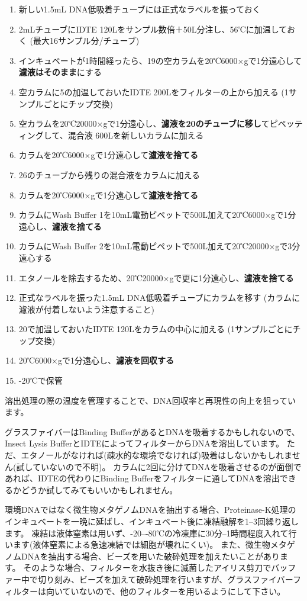 \documentclass[titlepage,10pt,a4paper,uplatex]{jsbook}
\renewcommand{\textbf}[1]{{\bfseries\sffamily#1}}
\begin{document}
\begin{enumerate}
\item 新しい1.5mL DNA低吸着チューブには正式なラベルを振っておく
\item 2mLチューブにIDTE 120{\textmu}Lをサンプル数倍＋50{\textmu}L分注し、56℃に加温しておく (最大16サンプル分/チューブ)
\item インキュベートが1時間経ったら、19の空カラムを20℃6000×gで1分遠心して\textbf{濾液はそのまま}にする
\item 空カラムに5の加温しておいたIDTE 200{\textmu}Lをフィルターの上から加える (1サンプルごとにチップ交換)
\item 空カラムを20℃20000×gで1分遠心し、\textbf{濾液を20のチューブに移し}てピペッティングして、混合液 600{\textmu}Lを新しいカラムに加える
\item カラムを20℃6000×gで1分遠心して\textbf{濾液を捨てる}
\item 26のチューブから残りの混合液をカラムに加える
\item カラムを20℃6000×gで1分遠心して\textbf{濾液を捨てる}
\item カラムにWash Buffer 1を10mL電動ピペットで500{\textmu}L加えて20℃6000×gで1分遠心し、\textbf{濾液を捨てる}
\item カラムにWash Buffer 2を10mL電動ピペットで500{\textmu}L加えて20℃20000×gで3分遠心する
\item エタノールを除去するため、20℃20000×gで更に1分遠心し、\textbf{濾液を捨てる}
\item 正式なラベルを振った1.5mL DNA低吸着チューブにカラムを移す (カラムに濾液が付着しないよう注意すること)
\item 20で加温しておいたIDTE 120{\textmu}Lをカラムの中心に加える (1サンプルごとにチップ交換)
\item 20℃6000×gで1分遠心し、\textbf{濾液を回収する}
\item -20℃で保管
\end{enumerate}

溶出処理の際の温度を管理することで、DNA回収率と再現性の向上を狙っています。

グラスファイバーはBinding BufferがあるとDNAを吸着するかもしれないので、Insect Lysis BufferとIDTEによってフィルターからDNAを溶出しています。
ただ、エタノールがなければ(疎水的な環境でなければ)吸着はしないかもしれません(試していないので不明)。
カラムに2回に分けてDNAを吸着させるのが面倒であれば、IDTEの代わりにBinding Bufferをフィルターに通してDNAを溶出できるかどうか試してみてもいいかもしれません。

環境DNAではなく微生物メタゲノムDNAを抽出する場合、Proteinase-K処理のインキュベートを一晩に延ばし、インキュベート後に凍結融解を1--3回繰り返します。
凍結は液体窒素は用いず、{-20}--{-80}℃の冷凍庫に30分--1時間程度入れて行います(液体窒素による急速凍結では細胞が壊れにくい)。
また、微生物メタゲノムDNAを抽出する場合、ビーズを用いた破砕処理を加えたいことがあります。
そのような場合、フィルターを水抜き後に滅菌したアイリス剪刀でバッファー中で切り刻み、ビーズを加えて破砕処理を行いますが、グラスファイバーフィルターは向いていないので、他のフィルターを用いるようにして下さい。
\end{document}
